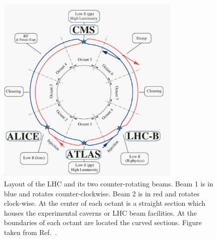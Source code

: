 \begin{figure}[!htb]
    \begin{center}
        \includegraphics[width=0.8\textwidth]{figures/chapter2/lhc_layout}
        \caption{
            Layout of the LHC and its two counter-rotating beams. Beam 1 is in blue and rotates
            counter-clockwise. Beam 2 is in red and rotates clock-wise.
            At the center of each octant is a straight section which houses
            the experimental caverns or LHC beam facilities.
            At the boundaries of each octant are located the curved sections.
            Figure taken from Ref.~\cite{LHCMachine}.%
        }
        \label{fig:lhc_layout}
    \end{center}
\end{figure}

